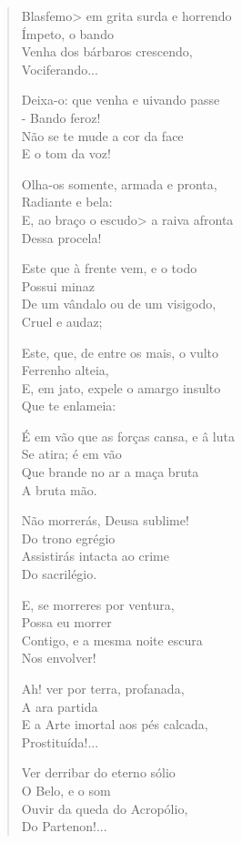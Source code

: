 \begin{verse}
Blasfemo> em grita surda e horrendo \\
Ímpeto, o bando \\
Venha dos bárbaros crescendo, \\
Vociferando...

Deixa-o: que venha e uivando passe \\
- Bando feroz! \\
Não se te mude a cor da face \\
E o tom da voz!

Olha-os somente, armada e pronta, \\
Radiante e bela: \\
E, ao braço o escudo> a raiva afronta \\
Dessa procela!

Este que à frente vem, e o todo \\
Possui minaz \\
De um vândalo ou de um visigodo, \\
Cruel e audaz;

Este, que, de entre os mais, o vulto \\
Ferrenho alteia, \\
E, em jato, expele o amargo insulto \\
Que te enlameia:

É em vão que as forças cansa, e â luta \\
Se atira; é em vão \\
Que brande no ar a maça bruta \\
A bruta mão.

Não morrerás, Deusa sublime! \\
Do trono egrégio \\
Assistirás intacta ao crime \\
Do sacrilégio.

E, se morreres por ventura, \\
Possa eu morrer \\
Contigo, e a mesma noite escura \\
Nos envolver!

Ah! ver por terra, profanada, \\
A ara partida \\
E a Arte imortal aos pés calcada, \\
Prostituída!...

Ver derribar do eterno sólio \\
O Belo, e o som \\
Ouvir da queda do Acropólio, \\
Do Partenon!...


\end{verse}
